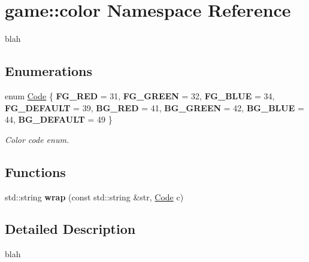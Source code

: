 \hypertarget{namespacegame_1_1color}{}\section{game\+:\+:color Namespace Reference}
\label{namespacegame_1_1color}


blah  


\subsection*{Enumerations}
\begin{DoxyCompactItemize}
\item 
\mbox{\label{namespacegame_1_1color_a24bd400aac9e8042c9d717391e45655a}} 
enum \hyperlink{namespacegame_1_1color_a24bd400aac9e8042c9d717391e45655a}{Code} \{ \newline
{\bfseries F\+G\+\_\+\+R\+ED} = 31, 
{\bfseries F\+G\+\_\+\+G\+R\+E\+EN} = 32, 
{\bfseries F\+G\+\_\+\+B\+L\+UE} = 34, 
{\bfseries F\+G\+\_\+\+D\+E\+F\+A\+U\+LT} = 39, 
\newline
{\bfseries B\+G\+\_\+\+R\+ED} = 41, 
{\bfseries B\+G\+\_\+\+G\+R\+E\+EN} = 42, 
{\bfseries B\+G\+\_\+\+B\+L\+UE} = 44, 
{\bfseries B\+G\+\_\+\+D\+E\+F\+A\+U\+LT} = 49
 \}\begin{DoxyCompactList}\small\item\em Color code enum. \end{DoxyCompactList}
\end{DoxyCompactItemize}
\subsection*{Functions}
\begin{DoxyCompactItemize}
\item 
\mbox{\label{namespacegame_1_1color_af6672ccde6549bd1741d68ed0b7e0f42}} 
std\+::string {\bfseries wrap} (const std\+::string \&str, \hyperlink{namespacegame_1_1color_a24bd400aac9e8042c9d717391e45655a}{Code} c)
\end{DoxyCompactItemize}


\subsection{Detailed Description}
blah 